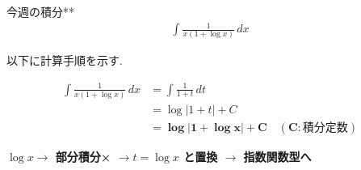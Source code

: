\documentclass[main]{subfiles}
\begin{document}

\begin{mondai}{11}{今週の積分}{**}
    \begin{align*}
        \int \frac{1}{x(1+\log x)} \, dx
    \end{align*}
\end{mondai}


\solutionhead
\hfill
以下に計算手順を示す.
\hfill\


\begin{align*}
\int \frac{1}{x(1+\log x)} \, dx &= \int \frac{1}{1+t} \, dt \\
&= \log|1+t| + C \\
&= \boldsymbol{
    \log|1+\log x| + C \quad (C:\textbf{積分定数})}
\end{align*}

\begin{focusbox}
\centering
\textbf{$\log x \rightarrow$ 部分積分×
$\rightarrow t = \log x$ と置換
$\rightarrow$ 指数関数型へ}
\end{focusbox}
\end{document}
